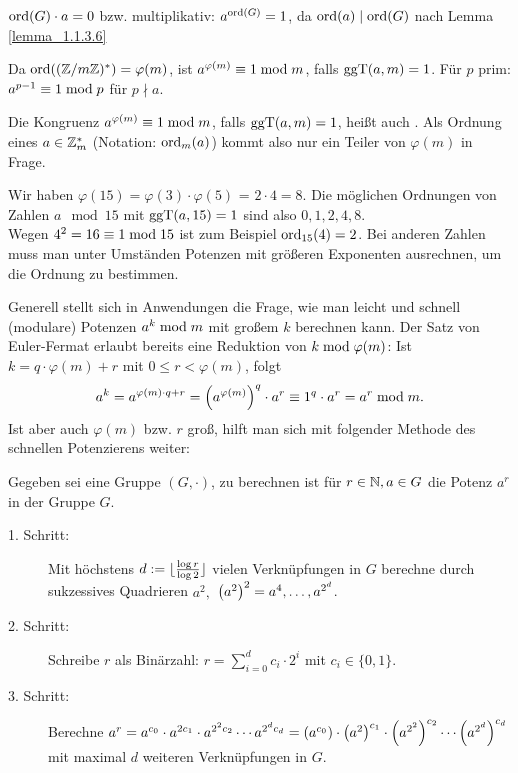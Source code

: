 \begin{folg}
	$\operatorname{ord}(G) \cdot a = 0$ bzw. multiplikativ: $a^{\operatorname{ord}(G)} = 1$, da $\operatorname{ord}(a) \mid \operatorname{ord}(G)$ nach Lemma \ref{lemma_1.1.3.6}
\end{folg}

\begin{folg}
	Da $\operatorname{ord}((\mathbb{Z}/m\mathbb{Z})^*) = \varphi(m)$, ist $a^{\varphi(m)} \equiv 1 \bmod m$, falls $\operatorname{ggT}(a,m)=1$. 
	Für $p$ prim: $a^{p-1} \equiv 1 \bmod p$ für $p \nmid a$. 
\end{folg}

\begin{bem}
	Die Kongruenz $a^{\varphi(m)} \equiv 1 \bmod m$, falls $\operatorname{ggT}(a,m)=1$, heißt auch . 
	Als Ordnung eines $a \in \mathbb{Z}_m^*$ (Notation: $\operatorname{ord}_m(a)$) kommt also nur ein Teiler von $\varphi(m)$ in Frage.
\end{bem}

\begin{bsp}
	Wir haben $\varphi(15) = \varphi(3) \cdot \varphi(5)$ = $2 \cdot 4 = 8$. 
	Die möglichen Ordnungen von Zahlen $a \mod 15$ mit $\operatorname{ggT}(a,15)=1$  sind also $0,1,2,4,8$.\\
	Wegen $4^2 = 16 \equiv 1 \bmod 15$ ist zum Beispiel $\operatorname{ord}_{15}(4) = 2$. 
	Bei anderen Zahlen muss man unter Umständen Potenzen mit größeren Exponenten ausrechnen, um die Ordnung zu bestimmen.
\end{bsp}

Generell stellt sich in Anwendungen die Frage, wie man leicht und schnell (modulare) Potenzen $a^k \bmod m$ mit großem $k$ berechnen kann. 
Der Satz von Euler-Fermat erlaubt bereits eine Reduktion von $k \bmod \varphi(m)$: Ist\linebreak
$k = q \cdot \varphi(m) + r$ mit $0 \leq r < \varphi(m)$, folgt
\[ a^k = a^{\varphi(m) \cdot q + r} = \left(a^{\varphi(m)}\right)^q \cdot a^r \equiv 1^q \cdot a^r = a^r \bmod m.\]
Ist aber auch $\varphi(m)$ bzw. $r$ groß, hilft man sich mit folgender Methode des schnellen Potenzierens weiter:

\begin{lemma}
	Gegeben sei eine Gruppe $(G,\cdot)$, zu berechnen ist für $r \in \mathbb{N}, a \in G$ die Potenz $a^r$ in der Gruppe $G$. 
	\begin{description}
		\item[1. Schritt:] Mit höchstens $d := \lfloor\frac{\log r}{\log 2}\rfloor$ vielen Verknüpfungen in $G$ berechne durch sukzessives Quadrieren $a^2,$\linebreak
		$\left(a^2\right)^2 = a^4, \dots, a^{2^d}$.
		\item[2. Schritt:] Schreibe $r$ als Binärzahl: $r = \sum_{i=0}^d c_i \cdot 2^i$ mit $c_i \in \{0,1\}$.
		\item[3. Schritt:] Berechne $a^r = a^{c_0} \cdot a^{2c_1} \cdot a^{2^2 c_2} \cdots a^{2^d c_d} = \left(a^{c_0}\right) \cdot \left(a^2\right)^{c_1} \cdot \left(a^{2^2}\right)^{c_2} \cdots \left(a^{2^d}\right)^{c_d}$ mit maximal $d$ weiteren Verknüpfungen in $G$. 
		\end{description}
\end{lemma}

